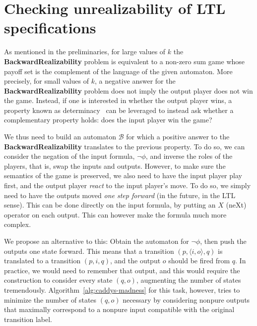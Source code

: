 \documentclass[runningheads,a4paper]{llncs}
\begin{document}
\section{Checking unrealizability of LTL specifications}\label{sec:unreal}

As mentioned in the preliminaries, for large values of $k$ the 
\textbf{BackwardRealizability} problem is equivalent to a non-zero sum game
whose payoff set is the complement of the language of the given automaton.
More precisely, for small values of $k$, a negative answer for the
\textbf{BackwardRealizability} problem does not imply the output player does
not win the game. Instead, if one is interested in whether the output player
wins, a property known as determinacy~\cite{borel} can be leveraged to instead
ask whether a complementary property holds: does the input player win the
game?

We thus need to build an automaton \(\mathcal{B}\) for which a positive answer to
the \textbf{BackwardRealizability} translates to the previous property.  To do
so, we can consider the negation of the input formula, \(\neg\phi\), and inverse the
roles of the players, that is, swap the inputs and outputs.  However, to make
sure the semantics of the game is preserved, we also need to have the input
player play first, and the output player \emph{react} to the input player's
move.  To do so, we simply need to have the outputs moved \emph{one step
  forward} (in the future, in the LTL sense).  This can be done directly on the
input formula, by putting an \(X\) (neXt) operator on each output.  This can
however make the formula much more complex.

We propose an alternative to this: Obtain the automaton for \(\neg \phi\), then push the
outputs one state forward.  This means that a transition \((p, \langle i, o \rangle, q)\) is
translated to a transition \((p, i, q)\), and the output \(o\) should be fired from
\(q\).  In practice, we would need to remember that output, and this would require
the construction to consider every state \((q, o)\), augmenting the number of
states tremendously.  Algorithm~\ref{alg:caddys-madness} for this task, however,
tries to minimize the number of states \((q, o)\) necessary by considering nonpure
outputs that maximally correspond to a nonpure input compatible with the
original transition label.

\vspace{1em}
\end{document}

